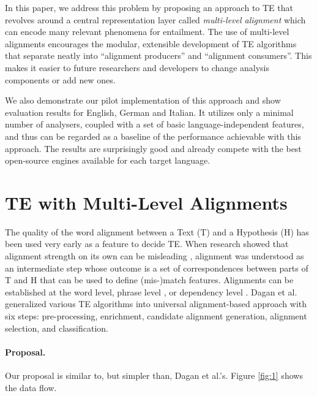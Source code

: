 \documentclass[11pt,letterpaper]{article}
\begin{document}
In this paper, we address this problem by proposing an approach to TE
that revolves around a central representation layer called {\em
  multi-level alignment} which can encode many relevant phenomena for
entailment. The use of multi-level alignments encourages the modular,
extensible development of TE algorithms that separate neatly into
``alignment producers'' and ``alignment consumers''. This makes it
easier to future researchers and developers to change analysis
components or add new ones. 

We also demonstrate our pilot implementation of this approach and
show evaluation results for English, German and Italian. It utilizes
only a minimal number of analysers, coupled with a set of basic
language-independent features, and thus can be regarded as a baseline
of the performance achievable with this approach.  The results are
surprisingly good and already compete with the best open-source
engines available for each target language.

\section{TE with Multi-Level Alignments}

The quality of the word alignment between a Text (T) and a Hypothesis
(H) has been used very early as a feature to decide TE. When research
showed that alignment strength on its own can be misleading
\cite{maccartney-EtAl:2006:HLT-NAACL06-Main}, alignment was 
understood as an intermediate step whose outcome is a set of
correspondences between parts of T and H that can be used to define
(mis-)match features. Alignments can be established at the
word level, phrase level \cite{MacCartney:EMNLP08}, or dependency
level \cite{dinu-wang:2009:EACL}. Dagan et
al.  generalized various TE algorithms into
universal alignment-based approach with six steps: pre-processing,
enrichment, candidate alignment generation, alignment selection, and
classification. 

\paragraph{Proposal.} Our proposal is similar to, but simpler than,
Dagan et al.'s. Figure \ref{fig:1} shows the data flow.
\end{document}
